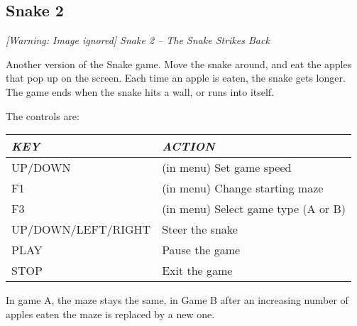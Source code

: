 \subsection{ Snake 2}
{\centering\itshape
  [Warning: Image ignored] %
 \newline
Snake 2 {--} The Snake Strikes Back
\par}

Another version of the Snake game. Move the snake around, and eat the
apples that pop up on the screen. Each time an apple is eaten, the
snake gets longer. The game ends when the snake hits a wall, or runs
into itself. 

The controls are:

\begin{center}\begin{tabular}{|p{5.0550003cm}|p{7.984cm}|}
\hline
{\centering\bfseries\itshape
KEY
\par}
&
{\centering\bfseries\itshape
ACTION
\par}
\\\hline
{\centering
UP/DOWN
\par}
&
(in menu) Set game speed
\\\hline
{\centering
F1
\par}
&
(in menu) Change starting maze
\\\hline
{\centering
F3
\par}
&
(in menu) Select game type (A or B)
\\\hline
{\centering
UP/DOWN/LEFT/RIGHT
\par}
&
Steer the snake
\\\hline
{\centering
PLAY
\par}
&
Pause the game
\\\hline
{\centering
STOP
\par}
&
Exit the game
\\\hline
\end{tabular}\end{center}
In game A, the maze stays the same, in Game B
after an increasing number of apples eaten the maze is replaced by a
new one.

